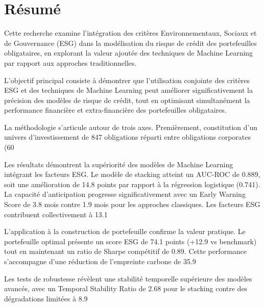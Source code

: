 \chapter*{Résumé}

Cette recherche examine l'intégration des critères Environnementaux, Sociaux et de Gouvernance (ESG) dans la modélisation du risque de crédit des portefeuilles obligataires, en explorant la valeur ajoutée des techniques de Machine Learning par rapport aux approches traditionnelles.

L'objectif principal consiste à démontrer que l'utilisation conjointe des critères ESG et des techniques de Machine Learning peut améliorer significativement la précision des modèles de risque de crédit, tout en optimisant simultanément la performance financière et extra-financière des portefeuilles obligataires.

La méthodologie s'articule autour de trois axes. Premièrement, constitution d'un univers d'investissement de 847 obligations réparti entre obligations corporates (60%

Les résultats démontrent la supériorité des modèles de Machine Learning intégrant les facteurs ESG. Le modèle de stacking atteint un AUC-ROC de 0.889, soit une amélioration de 14.8 points par rapport à la régression logistique (0.741). La capacité d'anticipation progresse significativement avec un Early Warning Score de 3.8 mois contre 1.9 mois pour les approches classiques. Les facteurs ESG contribuent collectivement à 13.1%

L'application à la construction de portefeuille confirme la valeur pratique. Le portefeuille optimal présente un score ESG de 74.1 points (+12.9 vs benchmark) tout en maintenant un ratio de Sharpe compétitif de 0.89. Cette performance s'accompagne d'une réduction de l'empreinte carbone de 35.9%

Les tests de robustesse révèlent une stabilité temporelle supérieure des modèles avancés, avec un Temporal Stability Ratio de 2.68 pour le stacking contre des dégradations limitées à 8.9%

